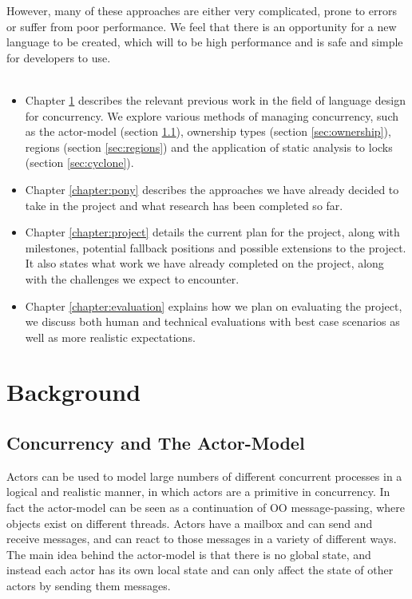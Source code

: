 \documentclass[11pt,a4paper]{report}
\begin{document}
However, many of these approaches are either very complicated, prone to errors or suffer from poor performance.
We feel that there is an opportunity for a new language to be created, which will to be high performance and is safe and simple for developers to use.
\\
\\
\begin{itemize}
\item Chapter \ref{chapter:background} describes the relevant previous work in the field of language design for concurrency.
	We explore various methods of managing concurrency, such as the actor-model (section \ref{sec:actor}), ownership types (section \ref{sec:ownership}), regions (section \ref{sec:regions}) and the application of static analysis to locks (section \ref{sec:cyclone}).
\item Chapter \ref{chapter:pony} describes the approaches we have already decided to take in the project and what research has been completed so far.
\item Chapter \ref{chapter:project} details the current plan for the project, along with milestones, potential fallback positions and possible extensions to the project.
	It also states what work we have already completed on the project, along with the challenges we expect to encounter.
\item Chapter \ref{chapter:evaluation} explains how we plan on evaluating the project, we discuss both human and technical evaluations with best case scenarios as well as more realistic expectations.
\end{itemize}

\newpage
\chapter{Background}
\label{chapter:background}

\section{Concurrency and The Actor-Model}
\label{sec:actor}

Actors can be used to model large numbers of different concurrent processes in a logical and realistic manner, in which actors are a primitive in concurrency.
In fact the actor-model can be seen as a continuation of OO message-passing, where objects exist on different threads.
Actors have a mailbox and can send and receive messages, and can react to those messages in a variety of different ways.
The main idea behind the actor-model is that there is no global state, and instead each actor has its own local state and can only affect the state of other actors by sending them messages.
\end{document}
